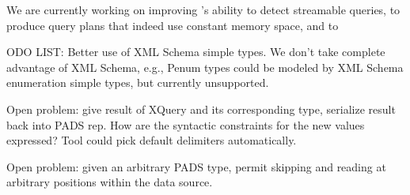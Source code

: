 \documentclass[nocopyrightspace]{sigplanconf}
\begin{document}
We are currently working on improving \Galax{}'s ability to detect
streamable queries, to produce query plans that indeed use constant
memory space, and to 

ODO LIST: Better use of XML Schema simple types.
We don't take complete advantage of XML Schema, e.g., Penum types
could be modeled by XML Schema enumeration simple types, but currently
unsupported.

Open problem: give result of XQuery and its corresponding type,
serialize result back into PADS rep.  How are the syntactic
constraints for the new values expressed?  Tool could pick default
delimiters automatically. 

Open problem: given an arbitrary PADS type, permit skipping and
reading at arbitrary positions within the data source. 


\small
 
\end{document}

